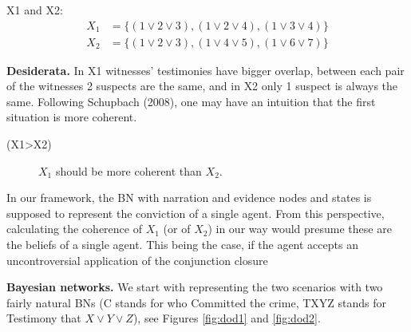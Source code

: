 \documentclass[
  10pt,
]{scrartcl}
\newcommand{\s}[1]{\textsf{#1}}
\begin{document}
\s{X1} and \s{X2}: 
\begin{align*}
    X_1 & = \{(1 \vee 2 \vee 3), (1\vee 2 \vee 4), (1 \vee 3 \vee 4)\}\\
    X_2 & =  \{(1 \vee 2 \vee 3), (1\vee  4 \vee 5), (1 \vee 6 \vee 7)\}
\end{align*}

\noindent \textbf{Desiderata.} In \s{X1} witnesses' testimonies have bigger overlap, between each pair of the witnesses 2 suspects are the same, and in \s{X2} only 1 suspect is always the same. Following Schupbach (2008), one may have an intuition that the first situation is more coherent.
\vspace{2mm}

\begin{description}
    \item[(\s{X1\textgreater X2})] $X_1$  should be more coherent than $X_2$.
\end{description}\vspace{2mm}

In our framework, the BN with narration and evidence nodes and states is supposed to represent the conviction of a single agent. From this perspective, calculating the coherence of \(X_1\) (or of \(X_2\)) in our way would presume these are the beliefs of a single agent. This being the case, if the agent accepts an uncontroversial application of the conjunction closure


\noindent \textbf{Bayesian networks.} We start with representing the two scenarios with two fairly natural BNs (\textsf{C} stands for who Committed the crime, \textsf{TXYZ} stands for Testimony that \(X\vee Y \vee Z\)), see Figures \ref{fig:dod1} and \ref{fig:dod2}.
\end{document}
